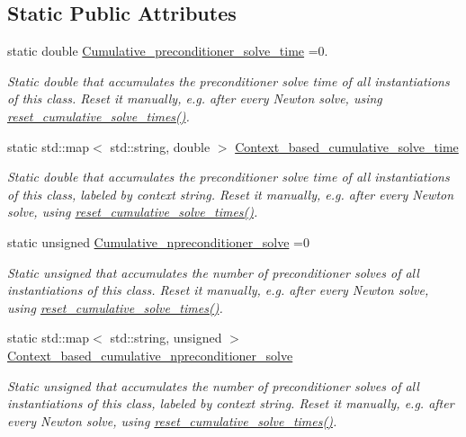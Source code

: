 \subsection*{Static Public Attributes}
\begin{DoxyCompactItemize}
\item 
static double \hyperlink{classoomph_1_1HyprePreconditioner_a53f01c25e89f237bd46c14f029f34a46}{Cumulative\+\_\+preconditioner\+\_\+solve\+\_\+time} =0.
\begin{DoxyCompactList}\small\item\em Static double that accumulates the preconditioner solve time of all instantiations of this class. Reset it manually, e.\+g. after every Newton solve, using \hyperlink{classoomph_1_1HyprePreconditioner_a126763a53b2c687bc1b150d0fc64fbb6}{reset\+\_\+cumulative\+\_\+solve\+\_\+times()}. \end{DoxyCompactList}\item 
static std\+::map$<$ std\+::string, double $>$ \hyperlink{classoomph_1_1HyprePreconditioner_a67a4607506c6fa1429f3e87ca04e42a5}{Context\+\_\+based\+\_\+cumulative\+\_\+solve\+\_\+time}
\begin{DoxyCompactList}\small\item\em Static double that accumulates the preconditioner solve time of all instantiations of this class, labeled by context string. Reset it manually, e.\+g. after every Newton solve, using \hyperlink{classoomph_1_1HyprePreconditioner_a126763a53b2c687bc1b150d0fc64fbb6}{reset\+\_\+cumulative\+\_\+solve\+\_\+times()}. \end{DoxyCompactList}\item 
static unsigned \hyperlink{classoomph_1_1HyprePreconditioner_ad38447ce80a362510590b770cc501885}{Cumulative\+\_\+npreconditioner\+\_\+solve} =0
\begin{DoxyCompactList}\small\item\em Static unsigned that accumulates the number of preconditioner solves of all instantiations of this class. Reset it manually, e.\+g. after every Newton solve, using \hyperlink{classoomph_1_1HyprePreconditioner_a126763a53b2c687bc1b150d0fc64fbb6}{reset\+\_\+cumulative\+\_\+solve\+\_\+times()}. \end{DoxyCompactList}\item 
static std\+::map$<$ std\+::string, unsigned $>$ \hyperlink{classoomph_1_1HyprePreconditioner_a1eedf6ffc280c11da2e5da705dc5a612}{Context\+\_\+based\+\_\+cumulative\+\_\+npreconditioner\+\_\+solve}
\begin{DoxyCompactList}\small\item\em Static unsigned that accumulates the number of preconditioner solves of all instantiations of this class, labeled by context string. Reset it manually, e.\+g. after every Newton solve, using \hyperlink{classoomph_1_1HyprePreconditioner_a126763a53b2c687bc1b150d0fc64fbb6}{reset\+\_\+cumulative\+\_\+solve\+\_\+times()}. \end{DoxyCompactList}\item 

\end{DoxyCompactItemize}
